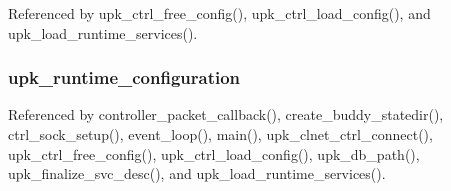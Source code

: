 Referenced by upk\_\-ctrl\_\-free\_\-config(), upk\_\-ctrl\_\-load\_\-config(), and upk\_\-load\_\-runtime\_\-services().

\subsubsection[{upk\_\-runtime\_\-configuration}]{ {\bf upk\_\-runtime\_\-configuration}}\label{group__functions_gaf7638ba77297c6ad954805d92fa33c13}


Referenced by controller\_\-packet\_\-callback(), create\_\-buddy\_\-statedir(), ctrl\_\-sock\_\-setup(), event\_\-loop(), main(), upk\_\-clnet\_\-ctrl\_\-connect(), upk\_\-ctrl\_\-free\_\-config(), upk\_\-ctrl\_\-load\_\-config(), upk\_\-db\_\-path(), upk\_\-finalize\_\-svc\_\-desc(), and upk\_\-load\_\-runtime\_\-services().


